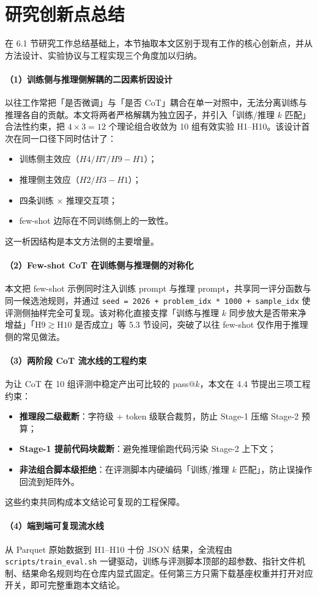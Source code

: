 \section{研究创新点总结}

在 6.1 节研究工作总结基础上，本节抽取本文区别于现有工作的核心创新点，并从方法设计、实验协议与工程实现三个角度加以归纳。

\paragraph{（1）训练侧与推理侧解耦的二因素析因设计}
以往工作常把「是否微调」与「是否 CoT」耦合在单一对照中，无法分离训练与推理各自的贡献。本文将两者严格解耦为独立因子，并引入「训练/推理 $k$ 匹配」合法性约束，把 $4 \times 3 = 12$ 个理论组合收敛为 10 组有效实验 H1--H10。该设计首次在同一口径下同时估计了：
\begin{itemize}
    \item 训练侧主效应（$H4/H7/H9 - H1$）；
    \item 推理侧主效应（$H2/H3 - H1$）；
    \item 四条训练 $\times$ 推理交互项；
    \item few-shot 边际在不同训练侧上的一致性。
\end{itemize}
这一析因结构是本文方法侧的主要增量。

\paragraph{（2）Few-shot CoT 在训练侧与推理侧的对称化}
本文把 few-shot 示例同时注入训练 prompt 与推理 prompt，共享同一评分函数与同一候选池规则，并通过 \texttt{seed = 2026 + problem\_idx * 1000 + sample\_idx} 使评测侧抽样完全可复现。该对称化直接支撑「训练与推理 $k$ 同步放大是否带来净增益」「$\mathrm{H9} \gtrsim \mathrm{H10}$ 是否成立」等 5.3 节设问，突破了以往 few-shot 仅作用于推理侧的常见做法。

\paragraph{（3）两阶段 CoT 流水线的工程约束}
为让 CoT 在 10 组评测中稳定产出可比较的 pass@$k$，本文在 4.4 节提出三项工程约束：
\begin{itemize}
    \item \textbf{推理段二级截断}：字符级 + token 级联合裁剪，防止 Stage-1 压缩 Stage-2 预算；
    \item \textbf{Stage-1 提前代码块裁断}：避免推理偷跑代码污染 Stage-2 上下文；
    \item \textbf{非法组合脚本级拒绝}：在评测脚本内硬编码「训练/推理 $k$ 匹配」，防止误操作回流到矩阵外。
\end{itemize}
这些约束共同构成本文结论可复现的工程保障。

\paragraph{（4）端到端可复现流水线}
从 Parquet 原始数据到 H1--H10 十份 JSON 结果，全流程由 \texttt{scripts/train\_eval.sh} 一键驱动，训练与评测脚本顶部的超参数、指针文件机制、结果命名规则均在仓库内显式固定。任何第三方只需下载基座权重并打开对应开关，即可完整重跑本文结论。
